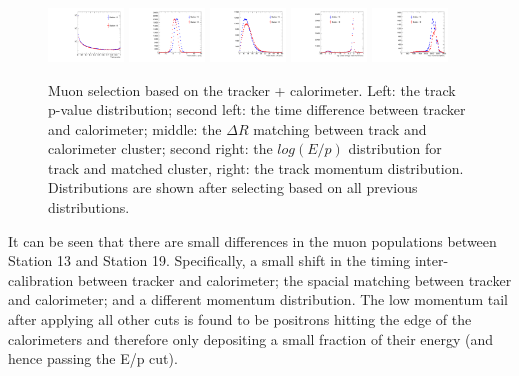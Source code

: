 \documentclass[a4paper, 11pt]{article}
\begin{document}
\begin{figure}[h]
\centering
\includegraphics[width=0.18\textwidth]{figures/St13_qc_pval.pdf}
\includegraphics[width=0.18\textwidth]{figures/St13_qc_dt.pdf}
\includegraphics[width=0.18\textwidth]{figures/St13_qc_dR.pdf}
\includegraphics[width=0.18\textwidth]{figures/St13_qc_Eop.pdf}
\includegraphics[width=0.18\textwidth]{figures/St13_qc_p.pdf}
\caption{Muon selection based on the tracker + calorimeter. Left: the track p-value distribution; second left: the time difference between tracker and calorimeter; middle: the $\Delta R$ matching between track and calorimeter cluster; second right: the $log(E/p)$ distribution for track and matched cluster, right: the track momentum distribution. Distributions are shown after selecting based on all previous distributions. \label{fig:muon_cuts}}
\end{figure}


It can be seen that there are small differences in the muon populations between Station 13 and Station 19. Specifically, a small shift in the timing inter-calibration between tracker and calorimeter; the spacial matching between tracker and calorimeter; and a different momentum distribution. The low momentum tail after applying all other cuts is found to be positrons hitting the edge of the calorimeters and therefore only depositing a small fraction of their energy (and hence passing the E/p cut).
\end{document}
